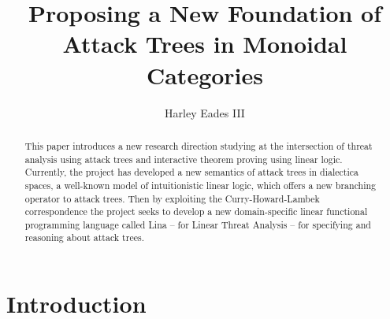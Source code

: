 \documentclass{llncs}
\date{}
\begin{document}

\title{Proposing a New Foundation of Attack Trees in Monoidal Categories}

\author{Harley Eades III}

\maketitle 

\begin{abstract}
  This paper introduces a new research direction studying at the
  intersection of threat analysis using attack trees and interactive
  theorem proving using linear logic.  Currently, the project has
  developed a new semantics of attack trees in dialectica spaces, a
  well-known model of intuitionistic linear logic, which offers a new
  branching operator to attack trees.  Then by exploiting the
  Curry-Howard-Lambek correspondence the project seeks to develop a
  new domain-specific linear functional programming language called
  Lina -- for Linear Threat Analysis -- for specifying and reasoning
  about attack trees.
\end{abstract}


\section{Introduction}
\label{sec:introduction}
\end{document}
